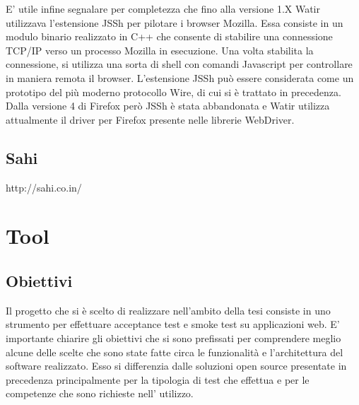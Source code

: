 \documentclass[12pt]{toptesi}
\begin{document}
E' utile infine segnalare per completezza che fino alla versione 1.X Watir utilizzava l'estensione JSSh per pilotare i browser Mozilla. Essa consiste in un modulo binario realizzato in C++ che consente di stabilire una connessione TCP/IP verso un processo Mozilla in esecuzione. Una volta stabilita la connessione, si utilizza una sorta di shell con comandi Javascript per controllare in maniera remota il browser. L'estensione JSSh può essere considerata come un prototipo del più moderno protocollo Wire, di cui si è trattato in precedenza. Dalla versione 4 di Firefox però JSSh è stata abbandonata e Watir utilizza attualmente il driver per Firefox presente nelle librerie WebDriver.






\section{Sahi}
http://sahi.co.in/


\chapter{Tool}

\section{Obiettivi}

Il progetto che si è scelto di realizzare nell'ambito della tesi consiste in uno strumento per effettuare acceptance test e smoke test su applicazioni web. E' importante chiarire gli obiettivi che si sono prefissati per comprendere meglio alcune delle scelte che sono state fatte circa le funzionalità e l'architettura del software realizzato. Esso si differenzia dalle soluzioni open source presentate in precedenza principalmente per la tipologia di test che effettua e per le competenze che sono richieste nell' utilizzo.
\end{document}

